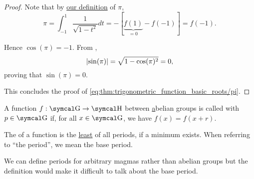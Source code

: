 \begin{proof}
  Note that by \hyperref[def:pi]{our definition} of \( \pi \),
  \begin{equation*}
    \pi
    =
    \int_{-1}^1 \frac 1 {\sqrt{1 - t^2}} dt
    =
    -[\underbrace{f(1)}_{=0} - f(-1)]
    =
    f(-1).
  \end{equation*}

  Hence \( \cos(\pi) = -1 \). From ,
  \begin{equation*}
    \left\vert \sin(\pi) \right\vert = \sqrt{1 - \cos(\pi)^2} = 0,
  \end{equation*}
  proving that \( \sin(\pi) = 0 \).

  This concludes the proof of \eqref{eq:thm:trigonometric_function_basic_roots/pi}.
\end{proof}

\begin{definition}\label{def:periodic_function}
  A function \( f: \CG \to \CH \) between \hyperref[def:abelian_group] abelian groups is called  with  \( p \in \CG \) if, for all \( x \in \CG \), we have \( f(x) = f(x + r) \).

  The  of a function is the \hyperref[def:preordered_set/largest_smallest_element]{least} of all periods, if a minimum exists. When referring to \enquote{the period}, we mean the base period.

  We can define periods for arbitrary magmas rather than abelian groups but the definition would make it difficult to talk about the base period.
\end{definition}

